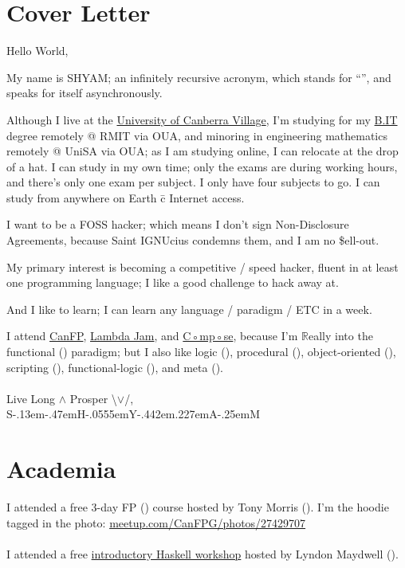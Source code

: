 \documentclass[12pt,a4paper,oneside]{article}
\def\ShYaM{\rm S\kern-.13em\lower-.47em\hbox{\fontsize{.5em}{0em}\selectfont H}\kern-.0555em{}Y\kern-.442em\lower.227em\hbox{A}\kern-.25em{}M}
\newcommand{\sh}[1]{{\color{gray}{#1}}}
\begin{document}
\section{Cover Letter}
Hello World,
\medskip\\\par{}My name is SHYAM; an infinitely recursive acronym, which stands for	``\sh{SHYAM Has Your Anomaly Mitigated}'', and speaks for itself asynchronously.%
\par{}Although I live at the \href{https://www.mystudentvillage.com/au/university-of-canberra-village/contact/}{University of Canberra Village}, I'm studying for my \href{https://www.open.edu.au/courses/it/rmit-university-bachelor-of-information-technology--rmi-cpt-deg-2017}{B.IT} degree remotely @ RMIT via OUA, and minoring in engineering mathematics remotely @ UniSA via OUA; as I am studying online, I can relocate at the drop of a hat. I can study in my own time; only the exams are during working hours, and there's only one exam per subject. I only have four subjects to go. I can study from anywhere on Earth \=c Internet access.
\\\par{}I want to be a FOSS hacker; which means I don't sign Non-Disclosure Agreements, because Saint IGNUcius condemns them, and I am no \$ell-out.
\par{}My primary interest is becoming a competitive / speed hacker, fluent in at least one programming language; I like a good challenge to hack away at.
\par{}And I like to learn; I can learn any language / paradigm / ETC in a week.
\\\par{}I attend \href{https://www.meetup.com/CanFPG/}{CanFP}, \href{http://lambdajam.yowconference.com.au/}{Lambda Jam}, and \href{http://www.composeconference.org/}{C◦mp◦se}, because I'm $\mathbb{R}$eally into the functional (\sh{Haskell}) paradigm; but I also like
logic (\sh{Prolog}),
procedural (\sh{assembly}),
object-oriented (\sh{Smalltalk \& C++; gcc \=c cpp supports inline assembly \=c portability}),
scripting (\sh{Perl}),
functional-logic (\sh{Curry \& Mercury}),
and
meta (\sh{Lisp \& ML}).
\\\medskip{}\\Live Long $\land$ Prosper \textbackslash$\lor$/,
\\\ShYaM

\vfill
\section{Academia}
I attended a free 3-day FP (\sh{Haskell}) course hosted by Tony Morris (\sh{Data61}).
I'm the hoodie tagged in the photo: \href{https://www.meetup.com/CanFPG/photos/27429707/#456137892}{meetup.com/CanFPG/photos/27429707}
\\\\I attended a free \href{http://www.composeconference.org/2017-melbourne/unconference/#introduction-to-haskell}{introductory Haskell workshop} hosted by Lyndon Maydwell (\sh{C◦mp◦se}).
\end{document}
